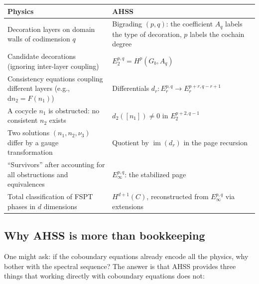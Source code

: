 \documentclass{SciPost}
\theoremstyle{definition}
\newcommand{\Gb}{G_b}
\newcommand{\dd}{\mathrm{d}}
\renewcommand{\im}{\operatorname{im}}
\begin{document}
\begin{center}
\renewcommand{\arraystretch}{1.5}
\begin{tabular}{>{\raggedright}p{6.5cm} p{6.5cm}}
\toprule
\textbf{Physics} & \textbf{AHSS} \\
\midrule
Decoration layers on domain walls of codimension $q$
& Bigrading $(p,q)$: the coefficient $A_q$ labels the type of decoration, $p$ labels the cochain degree \\
\midrule
Candidate decorations (ignoring inter-layer coupling)
& $E_2^{p,q} = H^p(\Gb, A_q)$ \\
\midrule
Consistency equations coupling different layers (e.g., $\dd n_2 = F(n_1)$)
& Differentials $d_r: E_r^{p,q} \to E_r^{p+r, q-r+1}$ \\
\midrule
A cocycle $n_1$ is obstructed: no consistent $n_2$ exists
& $d_2([n_1]) \neq 0$ in $E_2^{p+2, q-1}$ \\
\midrule
Two solutions $(n_1, n_2, \nu_3)$ differ by a gauge transformation
& Quotient by $\im(d_r)$ in the page recursion \\
\midrule
``Survivors'' after accounting for all obstructions and equivalences
& $E_\infty^{p,q}$: the stabilized page \\
\midrule
Total classification of FSPT phases in $d$ dimensions
& $H^{d+1}(C)$, reconstructed from $E_\infty^{p,q}$ via extensions \\
\bottomrule
\end{tabular}
\end{center}

\subsection{Why AHSS is more than bookkeeping}
\label{subsec:AHSS-power}

One might ask: if the coboundary equations already encode all the physics, why bother with the spectral sequence?
The answer is that AHSS provides three things that working directly with coboundary equations does not:
\end{document}
